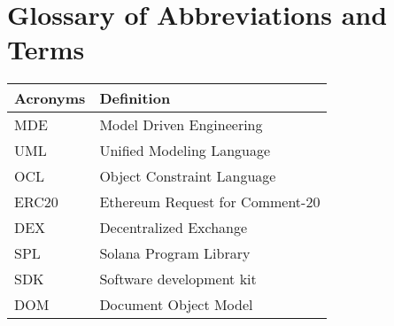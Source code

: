 \chapter*{Glossary of Abbreviations and Terms}

\begin{longtable}{|>{\raggedright\arraybackslash}p{4cm}|>{\raggedright\arraybackslash}p{10cm}|}
  \hline
  \textbf{Acronyms}       & \textbf{Definition}           
  \\
  \hline
  MDE                    & Model Driven Engineering  
  \\
  \hline
  UML                    & Unified Modeling Language    
  \\
  \hline
  OCL                    & Object Constraint Language
  \\
  \hline
  ERC20                  & Ethereum Request for Comment-20 
  \\
  \hline
  DEX                    & Decentralized Exchange
  \\
  \hline
  SPL                    & Solana Program Library                
  \\
  \hline
  SDK                    & Software development kit
  \\
  \hline
  DOM                    & Document Object Model 
  \\
  \hline
\end{longtable}